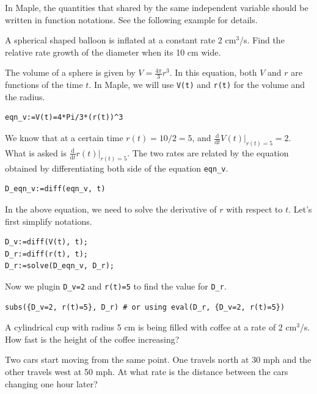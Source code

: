 \documentclass[en,11pt,simple]{elegantbook}
\let\BeginKnitrBlock\begin \let\EndKnitrBlock\end
\begin{document}
In Maple, the quantities that shared by the same independent variable should be written in function notations. See the following example for details.

\BeginKnitrBlock{example}{}{}
\protect\hypertarget{exm:unnamed-chunk-75}{}{\label{exm:unnamed-chunk-75} }
A spherical shaped balloon is inflated at a constant rate 2 cm\(^3\)/s. Find the relative rate growth of the diameter when its 10 cm wide.
\EndKnitrBlock{example}

\BeginKnitrBlock{solution}{}{}
{}
The volume of a sphere is given by \(V=\frac{4\pi}{3}r^3\). In this equation, both \(V\) and \(r\) are functions of the time \(t\). In Maple, we will use \texttt{V(t)} and \texttt{r(t)} for the volume and the radius.

\begin{verbatim}
eqn_v:=V(t)=4*Pi/3*(r(t))^3
\end{verbatim}

We know that at a certain time \(r(t)=10/2=5\), and \(\frac{\mathrm{d}}{\mathrm{d} t}V(t)|_{r(t)=5}=2\). What is asked is \(\frac{\mathrm{d}}{\mathrm{d} t}r(t)|_{r(t)=5}\). The two rates are related by the equation obtained by differentiating both side of the equation \texttt{eqn\_v}.

\begin{verbatim}
D_eqn_v:=diff(eqn_v, t)
\end{verbatim}

In the above equation, we need to solve the derivative of \(r\) with respect to \(t\). Let's first simplify notations.

\begin{verbatim}
D_v:=diff(V(t), t);
D_r:=diff(r(t), t);
D_r:=solve(D_eqn_v, D_r);
\end{verbatim}

Now we plugin \texttt{D\_v=2} and \texttt{r(t)=5} to find the value for \texttt{D\_r}.

\begin{verbatim}
subs({D_v=2, r(t)=5}, D_r) # or using eval(D_r, {D_v=2, r(t)=5})
\end{verbatim}
\EndKnitrBlock{solution}

\BeginKnitrBlock{exercise}{}{}
\protect\hypertarget{exr:unnamed-chunk-77}{}{\label{exr:unnamed-chunk-77} }
A cylindrical cup with radius 5 cm is being filled with coffee at a rate of 2 cm\(^3\)/s. How fast is
the height of the coffee increasing?
\EndKnitrBlock{exercise}

\BeginKnitrBlock{exercise}{}{}
\protect\hypertarget{exr:unnamed-chunk-78}{}{\label{exr:unnamed-chunk-78} }
Two cars start moving from the same point. One travels north at 30 mph and the other travels
west at 50 mph. At what rate is the distance between the cars changing one hour later?
\EndKnitrBlock{exercise}
\end{document}
